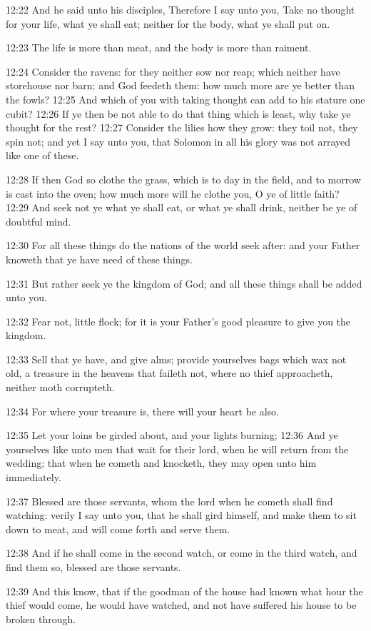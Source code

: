 12:22 And he said unto his disciples, Therefore I say unto you, Take
no thought for your life, what ye shall eat; neither for the body,
what ye shall put on.

12:23 The life is more than meat, and the body is more than raiment.

12:24 Consider the ravens: for they neither sow nor reap; which
neither have storehouse nor barn; and God feedeth them: how much more
are ye better than the fowls?  12:25 And which of you with taking
thought can add to his stature one cubit?  12:26 If ye then be not
able to do that thing which is least, why take ye thought for the
rest?  12:27 Consider the lilies how they grow: they toil not, they
spin not; and yet I say unto you, that Solomon in all his glory was
not arrayed like one of these.

12:28 If then God so clothe the grass, which is to day in the field,
and to morrow is cast into the oven; how much more will he clothe you,
O ye of little faith?  12:29 And seek not ye what ye shall eat, or
what ye shall drink, neither be ye of doubtful mind.

12:30 For all these things do the nations of the world seek after: and
your Father knoweth that ye have need of these things.

12:31 But rather seek ye the kingdom of God; and all these things
shall be added unto you.

12:32 Fear not, little flock; for it is your Father's good pleasure to
give you the kingdom.

12:33 Sell that ye have, and give alms; provide yourselves bags which
wax not old, a treasure in the heavens that faileth not, where no
thief approacheth, neither moth corrupteth.

12:34 For where your treasure is, there will your heart be also.

12:35 Let your loins be girded about, and your lights burning; 12:36
And ye yourselves like unto men that wait for their lord, when he will
return from the wedding; that when he cometh and knocketh, they may
open unto him immediately.

12:37 Blessed are those servants, whom the lord when he cometh shall
find watching: verily I say unto you, that he shall gird himself, and
make them to sit down to meat, and will come forth and serve them.

12:38 And if he shall come in the second watch, or come in the third
watch, and find them so, blessed are those servants.

12:39 And this know, that if the goodman of the house had known what
hour the thief would come, he would have watched, and not have
suffered his house to be broken through.

